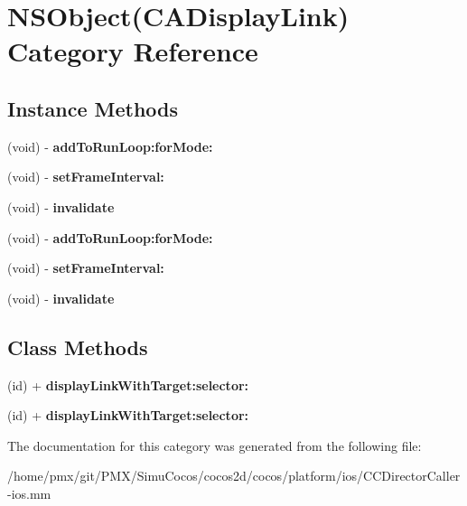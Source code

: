 \hypertarget{categoryNSObject_07CADisplayLink_08}{}\section{N\+S\+Object(C\+A\+Display\+Link) Category Reference}
\label{categoryNSObject_07CADisplayLink_08}
\subsection*{Instance Methods}
\begin{DoxyCompactItemize}
\item 
\mbox{\label{categoryNSObject_07CADisplayLink_08_a2edf852b668539179c75486f62b34128}} 
(void) -\/ {\bfseries add\+To\+Run\+Loop\+:for\+Mode\+:}
\item 
\mbox{\label{categoryNSObject_07CADisplayLink_08_ae7b95cb413e0970f6d9f17c045fc6ffa}} 
(void) -\/ {\bfseries set\+Frame\+Interval\+:}
\item 
\mbox{\label{categoryNSObject_07CADisplayLink_08_afd6c4168a3371e1f7e2c3b6971e3d32d}} 
(void) -\/ {\bfseries invalidate}
\item 
\mbox{\label{categoryNSObject_07CADisplayLink_08_a2edf852b668539179c75486f62b34128}} 
(void) -\/ {\bfseries add\+To\+Run\+Loop\+:for\+Mode\+:}
\item 
\mbox{\label{categoryNSObject_07CADisplayLink_08_ae7b95cb413e0970f6d9f17c045fc6ffa}} 
(void) -\/ {\bfseries set\+Frame\+Interval\+:}
\item 
\mbox{\label{categoryNSObject_07CADisplayLink_08_afd6c4168a3371e1f7e2c3b6971e3d32d}} 
(void) -\/ {\bfseries invalidate}
\end{DoxyCompactItemize}
\subsection*{Class Methods}
\begin{DoxyCompactItemize}
\item 
\mbox{\label{categoryNSObject_07CADisplayLink_08_acf4001d05d11af69c94db93097d55353}} 
(id) + {\bfseries display\+Link\+With\+Target\+:selector\+:}
\item 
\mbox{\label{categoryNSObject_07CADisplayLink_08_acf4001d05d11af69c94db93097d55353}} 
(id) + {\bfseries display\+Link\+With\+Target\+:selector\+:}
\end{DoxyCompactItemize}


The documentation for this category was generated from the following file\+:\begin{DoxyCompactItemize}
\item 
/home/pmx/git/\+P\+M\+X/\+Simu\+Cocos/cocos2d/cocos/platform/ios/C\+C\+Director\+Caller-\/ios.\+mm\end{DoxyCompactItemize}
